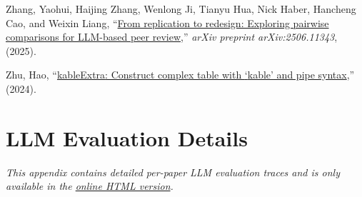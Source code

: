 \documentclass[
  11pt,
  letterpaper,
  DIV=11,
  numbers=noendperiod]{scrreprt}
\newlength{\cslhangindent}
\newenvironment{CSLReferences}[2] %
 {\begin{list}{}{%
  \setlength{\itemindent}{0pt}
  \setlength{\leftmargin}{0pt}
  \setlength{\parsep}{0pt}
  \ifodd #1
   \setlength{\leftmargin}{\cslhangindent}
   \setlength{\itemindent}{-1\cslhangindent}
  \fi
  \setlength{\itemsep}{#2\baselineskip}}}
 {\end{list}}
\begin{document}
\begin{CSLReferences}{1}{0}
Zhang, Yaohui, Haijing Zhang, Wenlong Ji, Tianyu Hua, Nick Haber,
Hancheng Cao, and Weixin Liang,
{``\href{https://arxiv.org/abs/2506.11343v1}{From replication to
redesign: Exploring pairwise comparisons for LLM-based peer review},''}
\emph{arXiv preprint arXiv:2506.11343}, (2025).

Zhu, Hao, {``\href{http://haozhu233.github.io/kableExtra/}{{kableExtra}:
Construct complex table with {`{kable}'} and pipe syntax},''} (2024).

\end{CSLReferences}

\cleardoublepage
{}
{}
\appendix

\chapter{LLM Evaluation Details}\label{llm-evaluation-details}

\emph{This appendix contains detailed per-paper LLM evaluation traces
and is only available in the
\href{https://llm-uj-research-eval.netlify.app/appendix_llm_traces.html}{online
HTML version}.}
\end{document}
